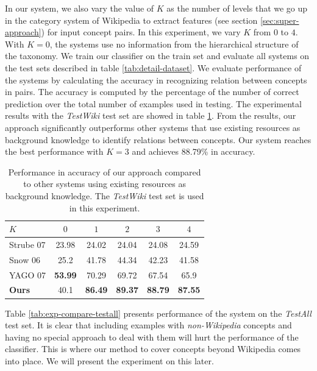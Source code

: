 In our system, we also vary the value of $K$ as the number of levels
that we go up in the category system of Wikipedia to extract features
(see section \ref{sec:super-approach}) for input concept pairs. In
this experiment, we vary $K$ from $0$ to $4$. With $K=0$, the systems
use no information from the hierarchical structure of the taxonomy. We
train our classifier on the train set and evaluate all systems on the
test sets described in table \ref{tab:detail-dataset}.  We evaluate
performance of the systems by calculating the accuracy in recognizing
relation between concepts in pairs. The accuracy is computed by the
percentage of the number of correct prediction over the total number
of examples used in testing. The experimental results with the {\em
  TestWiki} test set are showed in table
\ref{tab:exp-compare-performance}. From the results, our approach
significantly outperforms other systems that use existing resources as
background knowledge to identify relations between concepts. Our
system reaches the best performance with $K=3$ and achieves 88.79\% in
accuracy.

\begin{table}[t]
\begin{center}
\begin{tabular}{|l|c|c|c|c|c|}
  \hline
  $K$ &    $0$  &     $1$  &     $2$  &     $3$  &     $4$  \\
  \hline
  \hline
  Strube 07  &  23.98  &  24.02  &  24.04  &  24.08  &  24.59  \\
  \hline
  Snow 06       &   25.2  &  41.78  &  44.34  &  42.23  &  41.58  \\
  \hline
  YAGO 07 & \textbf{53.99} & 70.29 & 69.72 & 67.54 & 65.9 \\
  \hline
  \textbf{Ours}   &  40.1  &  \textbf{86.49}  &  \textbf{89.37}  &  \textbf{88.79}  &  \textbf{87.55}  \\
  \hline
\end{tabular}
\end{center}
\caption{Performance in accuracy of our approach compared to other systems 
  using existing resources as background knowledge. 
  The {\em TestWiki} test set is used in this experiment.}
\label{tab:exp-compare-performance}
\end{table}



Table \ref{tab:exp-compare-testall} presents performance of the system
on the {\em TestAll} test set. It is clear that including examples
with {\em non-Wikipedia} concepts and having no special approach to
deal with them will hurt the performance of the classifier. This is
where our method to cover concepts beyond Wikipedia comes into
place. We will present the experiment on this later.


